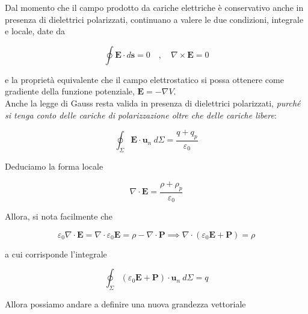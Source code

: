 Dal momento che il campo prodotto da cariche elettriche è conservativo anche in presenza di dielettrici polarizzati, continuano a valere le due condizioni, integrale e locale, date da

\begin{equation*}
    \oint \mathbf{E} \cdot d \mathbf{s} = 0 \quad , \quad  \nabla \times \mathbf{E} = 0
\end{equation*}

e la proprietà equivalente che il campo elettrostatico si possa ottenere come gradiente della funzione potenziale, $\mathbf{E} = - \nabla V$. \\

Anche la legge di Gauss resta valida in presenza di dielettrici polarizzati, \emph{purché si tenga conto delle cariche di polarizzazione oltre che delle cariche libere}:

\begin{tcolorbox}[colback=yellow!10!white, colframe=orange!70!black, boxrule=0.8pt]
\begin{equation}
    \oint_{\Sigma} \mathbf{E} \cdot \mathbf{u}_n \ d \Sigma = \frac{q + q_p}{\varepsilon_0}
\end{equation}
\end{tcolorbox}

Deduciamo la forma locale 

\begin{tcolorbox}[colback=yellow!10!white, colframe=orange!70!black, boxrule=0.8pt]
\begin{equation}
    \nabla \cdot \mathbf{E} = \frac{\rho + \rho_p}{\varepsilon_0}
\end{equation}
\end{tcolorbox}

\newpage

Allora, si nota facilmente che 

\begin{equation}
    \varepsilon_0 \nabla \cdot \mathbf{E} = \nabla \cdot \varepsilon_0 \mathbf{E} = \rho - \nabla \cdot \mathbf{P} \implies \nabla \cdot (\varepsilon_0 \mathbf{E} + \mathbf{P}) = \rho
\end{equation}

a cui corrisponde l'integrale 

\begin{equation}
    \oint_{\Sigma} (\varepsilon_0 \mathbf{E} + \mathbf{P}) \cdot \mathbf{u}_n \ d \Sigma = q
\end{equation}

Allora possiamo andare a definire una nuova grandezza vettoriale 

